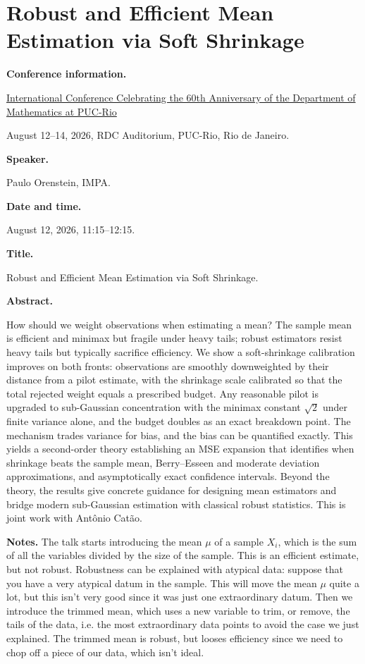 \section{Robust and Efficient Mean
Estimation via Soft Shrinkage}
\label{section-robust-efficient-mean}

\medskip\noindent
{\bf Conference information.}

\href{%
https://sites.google.com/view/%
60thanniversary-dmat-puc-rio/Home
}{International Conference Celebrating
the 60th Anniversary of the Department
of Mathematics at PUC-Rio}

August 12--14, 2026,
RDC Auditorium, PUC-Rio,
Rio de Janeiro.

\medskip\noindent
{\bf Speaker.}

Paulo Orenstein, IMPA.

\medskip\noindent
{\bf Date and time.}

August 12, 2026, 11:15--12:15.

\medskip\noindent
{\bf Title.}

Robust and Efficient Mean Estimation
via Soft Shrinkage.

\medskip\noindent
{\bf Abstract.}

How should we weight observations when
estimating a mean? The sample mean is
efficient and minimax but fragile under
heavy tails; robust estimators resist
heavy tails but typically sacrifice
efficiency. We show a soft-shrinkage
calibration improves on both fronts:
observations are smoothly downweighted
by their distance from a pilot estimate,
with the shrinkage scale calibrated so
that the total rejected weight equals a
prescribed budget. Any reasonable pilot
is upgraded to sub-Gaussian concentration
with the minimax constant $\sqrt{2}$ under
finite variance alone, and the budget
doubles as an exact breakdown point. The
mechanism trades variance for bias, and
the bias can be quantified exactly. This
yields a second-order theory establishing
an MSE expansion that identifies when
shrinkage beats the sample mean,
Berry--Esseen and moderate deviation
approximations, and asymptotically exact
confidence intervals. Beyond the theory,
the results give concrete guidance for
designing mean estimators and bridge
modern sub-Gaussian estimation with
classical robust statistics. This is
joint work with Ant\^onio Cat\~ao.

\medskip\noindent
{\bf Notes.}
The talk starts introducing the mean
$\mu$ of a sample $X_i$, which is 
the sum of all the variables divided
by the size of the sample. This is
an efficient estimate, but not robust.
Robustness can be explained with atypical
data: suppose that you have a very atypical
datum in the sample. This will move the
mean $\mu$ quite a lot, but this isn't very
good since it was just one extraordinary
datum. Then we introduce the trimmed mean,
which uses a new variable to trim, or
remove, the tails of the data, i.e.
the most extraordinary data points
to avoid the case we just explained.
The trimmed mean is robust, but looses
efficiency since we need to chop off a 
piece of our data, which isn't ideal.

